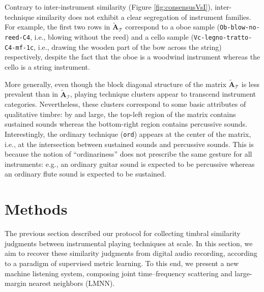 \documentclass{bmcart}
\makeatletter
\newcommand*{\eg}{e.g.,\@\xspace}
\newcommand*{\ie}{i.e.,\@\xspace}
\newcommand{\nmu}{}
\makeatother
\begin{document}
Contrary to inter-instrument similarity (Figure \ref{fig:consensusVsI}), inter-technique similarity does not exhibit a clear segregation of instrument families.
For example, the first two rows in $\widetilde{\mathbf{A}}_{\mathcal{T}}$ correspond to a oboe sample (\texttt{Ob-blow-no-reed-C4}, \ie{} blowing without the reed) and a cello sample (\texttt{Vc-legno-tratto-C4-mf-1c}, \ie{} drawing the wooden part of the bow across the string) respectively, despite the fact that the oboe is a woodwind instrument whereas the cello is a string instrument.

More generally, even though the block diagonal structure of the matrix $\widetilde{\mathbf{A}}_{\mathcal{T}}$ is less prevalent than in $\widetilde{\mathbf{A}}_{\mathcal{I}}$, playing technique clusters appear to transcend instrument categories.
Nevertheless, these clusters correspond to some basic attributes of qualitative timbre: by and large, the top-left region of the matrix contains sustained sounds whereas the bottom-right region contains percussive sounds.
Interestingly, the ordinary technique (\texttt{ord}) appears at the center of the matrix, \ie{} at the intersection between sustained sounds and percussive sounds.
This is because the notion of ``ordinariness'' does not prescribe the same gesture for all instruments: \eg{} an ordinary guitar sound is expected to be percussive whereas an ordinary flute sound is expected to be sustained.



\section*{\nmu Methods}
\label{sec:methods}
The previous section described our protocol for collecting timbral similarity judgments between instrumental playing techniques at scale.
In this section, we aim to recover these similarity judgments from digital audio recording, according to a paradigm of supervised metric learning.
To this end, we present a new machine listening system, composing joint time--frequency scattering and large-margin nearest neighbors (LMNN).

\end{document}
